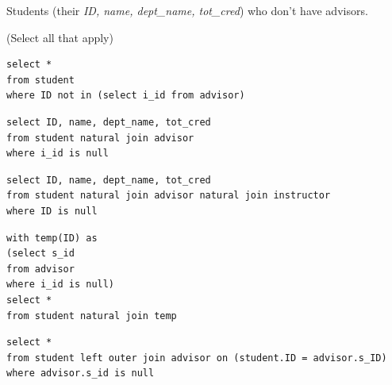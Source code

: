 \documentclass[12pt, addpoints, answers]{exam}
\begin{document}
\begin{questions}
\begin{minipage}{\linewidth}
\question[8]
Students (their \textit{ID, name, dept\_name, tot\_cred}) who don't have advisors.\par\vspace{0.5em}
(Select all that apply)\par\vspace{0.5em}
\begin{checkboxes} 
    \choice \begin{verbatim}
select *
from student
where ID not in (select i_id from advisor)
    \end{verbatim}
    \choice \begin{verbatim}
select ID, name, dept_name, tot_cred
from student natural join advisor
where i_id is null
    \end{verbatim}
    \choice \begin{verbatim}
select ID, name, dept_name, tot_cred
from student natural join advisor natural join instructor
where ID is null
    \end{verbatim}
    \choice \begin{verbatim}
with temp(ID) as
(select s_id
from advisor
where i_id is null)
select *
from student natural join temp
    \end{verbatim}
    \CorrectChoice \begin{verbatim}
select *
from student left outer join advisor on (student.ID = advisor.s_ID)
where advisor.s_id is null
    \end{verbatim}
\end{checkboxes}
\end{minipage}\vspace{1em}


\end{questions}
\end{document}
